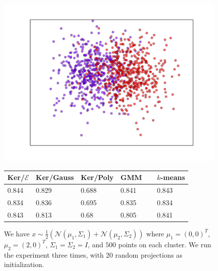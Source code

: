 \documentclass[aps,preprint,nofootinbib,floatfix]{revtex4-1}
\begin{document}
\begin{figure}
\begin{minipage}{.49\textwidth}
\includegraphics[scale=.45]{two_gaussians_closer.pdf}
\end{minipage}
\begin{minipage}{.49\textwidth}
\begin{tabular}{ l l l l l}
\hline
Ker/$\mathcal{E}$ & Ker/Gauss & Ker/Poly & GMM~~ & $k$-means \\
\hline
0.844 &
0.829 &
0.688 &
0.841 &
0.843 \\
0.834 &
0.836 &
0.695 &
0.835 &
0.834 \\
0.843 &
0.813 &
0.68 &
0.805 &
0.841 \\
\hline
\end{tabular}
\end{minipage}
\caption{\label{fig:weird1}
We have $x \sim \tfrac{1}{2}\left( \mathcal{N}(\mu_1, \Sigma_1) +
\mathcal{N}(\mu_2, \Sigma_2)\right)$ where $\mu_1 = (0,0)^T$, $\mu_2=(2,0)^T$,
$\Sigma_1 = \Sigma_2 = I$,
and $500$ points on each cluster. We run the experiment three times,
with 20 random projections as initialization.
}
\end{figure}
\end{document}
